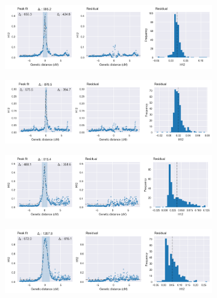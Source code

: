 \begin{refsection}
\begin{figure}[t!]
\begin{subfigure}[t]{0.32\textwidth}
    \end{subfigure}
    \hfill
    \begin{subfigure}[t]{0.32\textwidth}
        \centering
        \caption{}
        \includegraphics[width=1.1\textwidth,center,trim=0 27 380 0, clip]{artwork/chapter5/peak_fit_h12_gste_bfs.png}
    \end{subfigure}
    \begin{subfigure}[t]{0.32\textwidth}
        \centering
        \caption{}
        \includegraphics[width=1.1\textwidth,center,trim=0 27 380 0, clip]{artwork/chapter5/peak_fit_h12_gste_ugs.png}
    \end{subfigure}
    \vspace{0cm}
    \begin{subfigure}[t]{0.32\textwidth}
        \centering
        \caption{}
        \includegraphics[width=1.1\textwidth,center,trim=0 27 380 0, clip]{artwork/chapter5/peak_fit_h12_cyp9k1_bfs.png}
    \end{subfigure}
    \hfill
    \begin{subfigure}[t]{0.32\textwidth}
        \centering
        \caption{}
        \includegraphics[width=1.1\textwidth,center,trim=0 27 380 0, clip]{artwork/chapter5/peak_fit_h12_cyp9k1_bfm.png}

\end{subfigure}
\end{figure}
\end{refsection}
